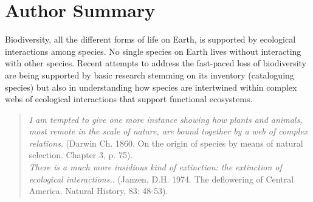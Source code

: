 \documentclass[10pt,letterpaper]{article}
\begin{document}
\section*{Author Summary}
Biodiversity, all the different forms of life on Earth, is supported by ecological interactions among species. No single species on Earth lives without interacting with other species. Recent attempts to address the fast-paced loss of biodiversity are being supported by basic research stemming on its inventory (cataloguing species) but also in understanding how species are intertwined within complex webs of ecological interactions that support functional ecosystems.\\
\noindent\hrulefill
\bigskip
\linenumbers

\begin{quotation}
  \textit{I am tempted to give one more instance showing how plants and animals, most remote in the scale of nature, are bound together by a web of complex relations}. (Darwin Ch. 1860. On the origin of species by means of natural selection. Chapter 3, p. 75).\\
  \textit{There is a much more insidious kind of extinction: the extinction of ecological interactions.}. (Janzen, D.H. 1974. The deflowering of Central America. Natural History, 83: 48-53).\\
\bigskip
\end{quotation}
\end{document}
